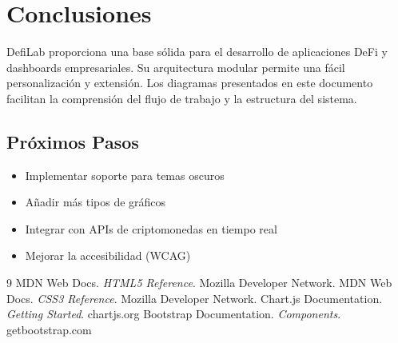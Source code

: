 \documentclass[a4paper,12pt]{article}
\begin{document}
\section{Conclusiones}

DefiLab proporciona una base sólida para el desarrollo de aplicaciones DeFi y dashboards empresariales. Su arquitectura modular permite una fácil personalización y extensión. Los diagramas presentados en este documento facilitan la comprensión del flujo de trabajo y la estructura del sistema.

\subsection*{Próximos Pasos}
\begin{itemize}
    \item Implementar soporte para temas oscuros
    \item Añadir más tipos de gráficos
    \item Integrar con APIs de criptomonedas en tiempo real
    \item Mejorar la accesibilidad (WCAG)
\end{itemize}

\begin{thebibliography}{9}
     MDN Web Docs. \textit{HTML5 Reference}. Mozilla Developer Network.
     MDN Web Docs. \textit{CSS3 Reference}. Mozilla Developer Network.
     Chart.js Documentation. \textit{Getting Started}. chartjs.org
     Bootstrap Documentation. \textit{Components}. getbootstrap.com
\end{thebibliography}
\end{document}
